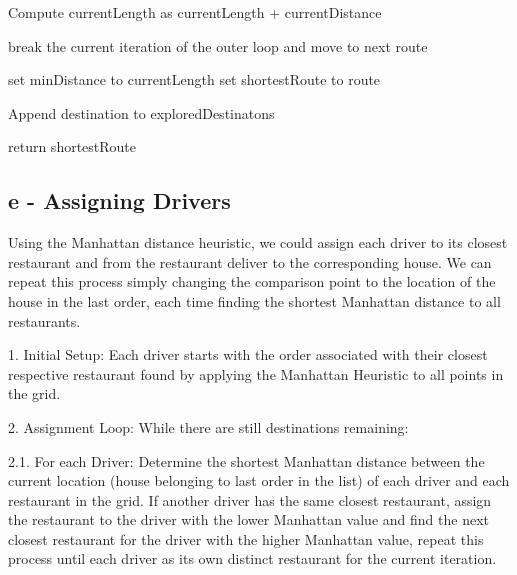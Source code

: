 \documentclass{article}
\begin{document}
\begin{algorithm}
\begin{algorithmic}
        \State Compute currentLength as currentLength + currentDistance 

        
            \State break the current iteration of the outer loop and move to next route\newline
        \EndIf       
        
    \EndFor


        \State set minDistance to currentLength
        \State set shortestRoute to route     
    \EndIf

    \State Append destination to exploredDestinatons \newline    
\EndFor

\State return shortestRoute
    
\EndProcedure \newline

\end{algorithmic}
\end{algorithm}

\subsection{e - Assigning Drivers}

Using the Manhattan distance heuristic, we could assign each driver to its closest restaurant and from the restaurant deliver to the corresponding house. We can repeat this process simply changing the comparison point to the location of the house in the last order, each time finding the shortest Manhattan distance to all restaurants. \newline

1. Initial Setup: Each driver starts with the order associated with their closest respective restaurant found by applying the Manhattan Heuristic to all points in the grid. \newline

2. Assignment Loop: While there are still destinations remaining:

2.1. For each Driver: Determine the shortest Manhattan distance between the current location (house belonging to last order in the list) of each driver and each restaurant in the grid. If another driver has the same closest restaurant, assign the restaurant to the driver with the lower Manhattan value and find the next closest restaurant for the driver with the higher Manhattan value, repeat this process until each driver as its own distinct restaurant for the current iteration. 
\end{document}
